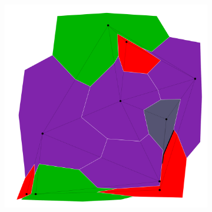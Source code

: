 \documentclass{article}
\begin{document}
\begin{figure}[h!]
\begin{subfigure}{0.18\textwidth}
				\caption{}
			\end{subfigure}
			\;
			\begin{subfigure}{0.18\textwidth}
				\centering
				\includegraphics[width=\textwidth]{images/sequences/forward_backtracking/bt_forward_I00011}
				\caption{}
			\end{subfigure} \\
			

\end{figure}
\end{document}
